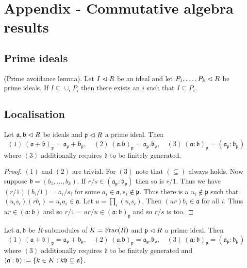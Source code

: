 \documentclass{memoir}
\begin{document}
\chapter{Appendix - Commutative algebra results}
\section{Prime ideals}
\begin{lemma}
    \label{lemma:prime_avoidance}
    (Prime avoidance lemma).
    Let $I\vartriangleleft R$ be an ideal and let $P_1,\dots,P_k\vartriangleleft R$ be prime ideals.
    If $I \subseteq \cup_iP_i$ then there exists an $i$ such that $I\subseteq P_i$.
\end{lemma}
\section{Localisation}
\begin{proposition}
    Let $\mathfrak a,\mathfrak b \vartriangleleft R$ be ideals and $\mathfrak p \vartriangleleft R$ a prime ideal.
    Then 
    \begin{equation}
        (1)\ (\mathfrak a + \mathfrak b)_{\mathfrak p} = \mathfrak a_{\mathfrak p} + \mathfrak b_{\mathfrak p}, \quad (2)\ (\mathfrak a . \mathfrak b)_{\mathfrak p} = \mathfrak a_{\mathfrak p} . \mathfrak b_{\mathfrak p}, \quad (3)\ (\mathfrak a : \mathfrak b)_{\mathfrak p} = (\mathfrak a_{\mathfrak p} : \mathfrak b_{\mathfrak p})
    \end{equation}
    where $(3)$ additionally requires $\mathfrak b$ to be finitely generated.
\end{proposition}
\begin{proof}
    $(1)$ and $(2)$ are trivial.
    For $(3)$ note that $(\subseteq)$ always holds.
    Now suppose $\mathfrak b = (b_1,\dots,b_k)$.
    If $r/s\in(\mathfrak a_{\mathfrak p}:\mathfrak b_{\mathfrak p})$ then so is $r/1$.
    Thus we have $(r/1)(b_i/1)=a_i/s_i$ for some $a_i\in\mathfrak a,s_i\not\in\mathfrak p$.
    Thus there is a $u_i\not\in\mathfrak p$ such that $(u_is_i)(rb_i)=u_ia_i\in\mathfrak a$.
    Let $u = \prod_i(u_is_i)$.
    Then $(ur)b_i\in\mathfrak a$ for all $i$.
    Thus $ur\in (\mathfrak a:\mathfrak b)$ and so $r/1 = ur/u \in (\mathfrak a:\mathfrak b)_{\mathfrak p}$ and so $r/s$ is too.
\end{proof}
\begin{proposition}
    Let $\mathfrak a,\mathfrak b$ be $R$-submodules of $K = \text{Frac}(R)$ and $\mathfrak p \vartriangleleft R$ a prime ideal.
    Then 
    \begin{equation}
        (1)\ (\mathfrak a + \mathfrak b)_{\mathfrak p} = \mathfrak a_{\mathfrak p} + \mathfrak b_{\mathfrak p}, \quad (2)\ (\mathfrak a . \mathfrak b)_{\mathfrak p} = \mathfrak a_{\mathfrak p} . \mathfrak b_{\mathfrak p}, \quad (3)\ (\mathfrak a : \mathfrak b)_{\mathfrak p} = (\mathfrak a_{\mathfrak p} : \mathfrak b_{\mathfrak p})
    \end{equation}
    where $(3)$ additionally requires $\mathfrak b$ to be finitely generated and $(\mathfrak a:\mathfrak b) := \lbrace k\in K:k\mathfrak b \subseteq \mathfrak a\rbrace$.
\end{proposition}
\end{document}
